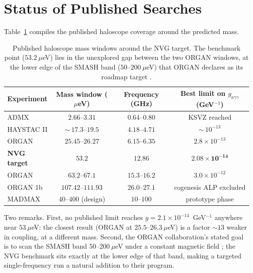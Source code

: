 \documentclass[11pt,a4paper]{article}
\begin{document}
\section{Status of Published Searches}
\label{sec:status}

Table~\ref{tab:gap} compiles the published haloscope coverage around the
predicted mass.

\begin{table}[h]
\centering
\caption{Published haloscope mass windows around the NVG target. The
benchmark point ($53.2~\mu$eV) lies in the unexplored gap between the two
ORGAN windows, at the lower edge of the SMASH band ($50$--$200~\mu$eV)
\cite{SMASH} that ORGAN declares as its roadmap target \cite{ORGAN2022}.}
\label{tab:gap}
\begin{tabular}{lccc}
\toprule
Experiment & Mass window ($\mu$eV) & Frequency (GHz) & Best limit on $g_{a\gamma\gamma}$ (GeV$^{-1}$) \\
\midrule
ADMX \cite{ADMX2018} & $2.66$--$3.31$ & $0.64$--$0.80$ & KSVZ reached \\
HAYSTAC II \cite{HAYSTAC2025} & ${\sim}\,17.3$--$19.5$ & $4.18$--$4.71$ & ${\sim}\,10^{-13}$ \\
ORGAN \cite{ORGAN26} & $25.45$--$26.27$ & $6.15$--$6.35$ & $2.8\times 10^{-13}$ \\
\textbf{NVG target} & $\mathbf{53.2}$ & $\mathbf{12.86}$ & $\mathbf{2.08\times 10^{-14}}$ \\
ORGAN \cite{ORGAN2022} & $63.2$--$67.1$ & $15.3$--$16.2$ & $3.0\times 10^{-12}$ \\
ORGAN 1b \cite{ORGAN1b} & $107.42$--$111.93$ & $26.0$--$27.1$ & cogenesis ALP excluded \\
MADMAX \cite{MADMAX2019,MADMAXproto} & $40$--$400$ (design) & $10$--$100$ & prototype phase \\
\bottomrule
\end{tabular}
\end{table}

Two remarks. First, no published limit reaches
$g = 2.1\times 10^{-14}$~GeV$^{-1}$ anywhere near $53~\mu$eV: the closest
result (ORGAN at $25.5$--$26.3~\mu$eV) is a factor ${\sim}13$ weaker in
coupling, at a different mass. Second, the ORGAN collaboration's stated goal is
to scan the SMASH band $50$--$200~\mu$eV under a constant magnetic field
\cite{ORGAN2022}; the NVG benchmark sits exactly at the lower edge of that
band, making a targeted single-frequency run a natural addition to their
program.
\end{document}
